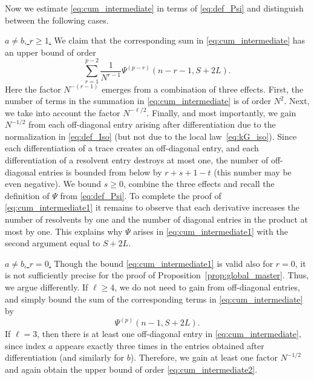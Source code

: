 \documentclass[10pt]{amsart}
\numberwithin{equation}{section}
\newcommand{\nc}{\normalcolor}
\begin{document}
Now we estimate \eqref{eq:cum_intermediate} in terms of \eqref{eq:def_Psi} and distinguish between the following cases. 

\smallskip

\noindent\underline{$a\neq b$, $r\ge 1$.} We claim that the corresponding sum in \eqref{eq:cum_intermediate} has an upper bound of order \nc
\begin{equation}
\sum_{r=1}^{p-2}\frac{1}{N^{r-1}} \Psi^{(p-r)}(n-r-1,S+2L).
\label{eq:cum_intermediate1}
\end{equation}
 Here the factor $N^{-(r-1)}$ emerges from a combination of three effects. First, the number of terms in the summation in \eqref{eq:cum_intermediate} is of order $N^2$. Next, we take into account the factor $N^{-\ell/2}$. Finally, and most importantly, we gain $N^{-1/2}$ from each off-diagonal entry arising after differentiation due to the normalization in \eqref{eq:def_Iso} (but not due to the local law~\eqref{eq:kG_iso}). Since each differentiation of a trace creates an off-diagonal entry, and each differentiation of a resolvent entry destroys at most one, the number of off-diagonal entries is bounded from below by  $r+s+1-t$ (this number may be even negative). We bound $s\ge 0$, combine the three effects and recall the definition of $\Psi$ from \eqref{eq:def_Psi}. To complete the proof of \eqref{eq:cum_intermediate1} it remains to observe that each derivative increases the number of resolvents by one and the number of diagonal entries in the product at most by one. This explains why $\Psi$ arises in \eqref{eq:cum_intermediate1} with the second argument equal to $S+2L$. 






\smallskip

\noindent\underline{$a\neq b$, $r=0$.} Though the bound \eqref{eq:cum_intermediate1} is valid also for $r=0$, it is not sufficiently precise for the proof of Proposition~\ref{prop:global_master}. Thus, we argue differently. If $\ell\ge 4$, we do not need to gain from off-diagonal entries, and simply bound the sum of the corresponding terms in \eqref{eq:cum_intermediate} by
\begin{equation}
\Psi^{(p)}(n-1,S+2L).
\label{eq:cum_intermediate2}
\end{equation}
If $\ell=3$, then there is at least one off-diagonal entry in \eqref{eq:cum_intermediate}, since index $a$ appears exactly three times in the entries obtained after differentiation (and similarly for $b$). Therefore, we gain at least one factor $N^{-1/2}$ and again obtain the upper bound of order \eqref{eq:cum_intermediate2}.
\end{document}
